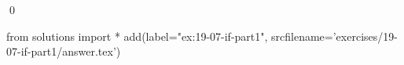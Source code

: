 
\begin{ex}
  \label{ex:19-07-if-part1}
  
  \qed
\end{ex}
\begin{python0}
from solutions import *
add(label="ex:19-07-if-part1",
    srcfilename='exercises/19-07-if-part1/answer.tex')
\end{python0}
